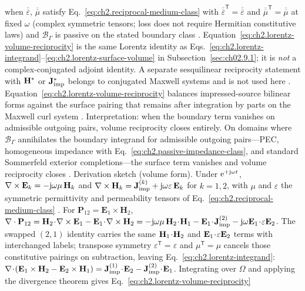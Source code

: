 when \(\overline{\overline{\varepsilon}}\), \(\overline{\overline{\mu}}\) satisfy
Eq.~\eqref{eq:ch2.reciprocal-medium-class} with $\overline{\overline{\varepsilon}}^{\mathsf{T}}=\overline{\overline{\varepsilon}}$ and
$\overline{\overline{\mu}}^{\mathsf{T}}=\overline{\overline{\mu}}$ at fixed $\omega$ (complex symmetric tensors; loss does not require
Hermitian constitutive laws) and \(\mathcal{B}_\Gamma\) is passive on the stated boundary class
\cite{stratton1941,collin2001,harrington2001}.
Equation~\eqref{eq:ch2.lorentz-volume-reciprocity} is the same Lorentz identity as
Eqs.~\eqref{eq:ch2.lorentz-integrand}--\eqref{eq:ch2.lorentz-surface-volume} in Subsection~\ref{sec:ch02.9.1};
it is \emph{not} a complex-conjugated adjoint identity.
A separate sesquilinear reciprocity statement with $\mathbf{H}^{*}$ or $\mathbf{J}_{\mathrm{imp}}^{*}$ belongs to conjugated Maxwell systems
and is not used here \cite{harrington2001}.
Equation~\eqref{eq:ch2.lorentz-volume-reciprocity}
balances impressed-source bilinear forms against the surface pairing that remains after
integration by parts on the Maxwell curl system \cite{stratton1941}. Interpretation: when the
boundary term vanishes on admissible outgoing pairs, volume reciprocity closes entirely. On domains where
\(\mathcal{B}_\Gamma\) annihilates the boundary integrand for admissible outgoing pairs---PEC,
homogeneous impedance with Eq.~\eqref{eq:ch2.passive-impedance-class}, and standard
Sommerfeld exterior completions---the surface term vanishes and volume reciprocity closes
\cite{stratton1941}.
Derivation sketch (volume form). Under $\mathrm{e}^{+\mathrm{j}\omega t}$, $\nabla\times\mathbf{E}_{k}=-\mathrm{j}\omega\mu\,\mathbf{H}_{k}$ and
$\nabla\times\mathbf{H}_{k}=\mathbf{J}_{\mathrm{imp}}^{(k)}+\mathrm{j}\omega\varepsilon\,\mathbf{E}_{k}$ for $k=1,2$, with $\mu$ and $\varepsilon$ the symmetric
permittivity and permeability tensors of Eq.~\eqref{eq:ch2.reciprocal-medium-class} \cite{stratton1941,collin2001}.
For $\mathbf{P}_{12}=\mathbf{E}_{1}\times\mathbf{H}_{2}$,
$\nabla\cdot\mathbf{P}_{12}=\mathbf{H}_{2}\!\cdot\!\curl\E_{1}-\mathbf{E}_{1}\!\cdot\!\curl\H_{2}
=-\jj\omega\mu\,\mathbf{H}_{2}\!\cdot\!\H_{1}-\mathbf{E}_{1}\!\cdot\!\Jimp^{(2)}-\jj\omega\mathbf{E}_{1}\!\cdot\!\varepsilon\E_{2}$.
The swapped $(2,1)$ identity carries the same $\mathbf{H}_{1}\!\cdot\!\mathbf{H}_{2}$ and $\mathbf{E}_{1}\!\cdot\!\varepsilon\mathbf{E}_{2}$ terms with interchanged labels;
transpose symmetry $\varepsilon^{\mathsf{T}}=\varepsilon$ and $\mu^{\mathsf{T}}=\mu$ cancels those constitutive pairings on subtraction, leaving
Eq.~\eqref{eq:ch2.lorentz-integrand}:
$\nabla\!\cdot\!(\mathbf{E}_1\times\mathbf{H}_2-\mathbf{E}_2\times\mathbf{H}_1)=\mathbf{J}_{\mathrm{imp}}^{(1)}\!\cdot\!\mathbf{E}_2-\mathbf{J}_{\mathrm{imp}}^{(2)}\!\cdot\!\mathbf{E}_1$.
Integrating over $\Omega$ and applying the divergence theorem gives Eq.~\eqref{eq:ch2.lorentz-volume-reciprocity}
